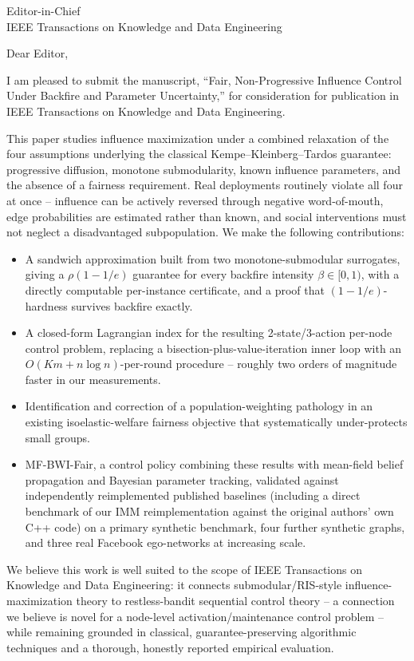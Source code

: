 \documentclass[11pt]{letter}
\begin{document}
\begin{letter}{Editor-in-Chief\\IEEE Transactions on Knowledge and Data Engineering}

\opening{Dear Editor,}

I am pleased to submit the manuscript, ``Fair, Non-Progressive Influence
Control Under Backfire and Parameter Uncertainty,'' for consideration for
publication in IEEE Transactions on Knowledge and Data Engineering.

This paper studies influence maximization under a combined relaxation of
the four assumptions underlying the classical Kempe--Kleinberg--Tardos
guarantee: progressive diffusion, monotone submodularity, known influence
parameters, and the absence of a fairness requirement. Real deployments
routinely violate all four at once -- influence can be actively reversed
through negative word-of-mouth, edge probabilities are estimated rather
than known, and social interventions must not neglect a disadvantaged
subpopulation. We make the following contributions:

\begin{itemize}
\item A sandwich approximation built from two monotone-submodular
  surrogates, giving a $\rho(1-1/e)$ guarantee for every backfire
  intensity $\beta \in [0,1)$, with a directly computable per-instance
  certificate, and a proof that $(1-1/e)$-hardness survives backfire
  exactly.
\item A closed-form Lagrangian index for the resulting 2-state/3-action
  per-node control problem, replacing a bisection-plus-value-iteration
  inner loop with an $O(Km + n\log n)$-per-round procedure -- roughly
  two orders of magnitude faster in our measurements.
\item Identification and correction of a population-weighting pathology
  in an existing isoelastic-welfare fairness objective that
  systematically under-protects small groups.
\item MF-BWI-Fair, a control policy combining these results with
  mean-field belief propagation and Bayesian parameter tracking,
  validated against independently reimplemented published baselines
  (including a direct benchmark of our IMM reimplementation against the
  original authors' own C++ code) on a primary synthetic benchmark, four
  further synthetic graphs, and three real Facebook ego-networks at
  increasing scale.
\end{itemize}

We believe this work is well suited to the scope of IEEE Transactions on
Knowledge and Data Engineering: it connects submodular/RIS-style
influence-maximization theory to restless-bandit sequential control
theory -- a connection we believe is novel for a node-level
activation/maintenance control problem -- while remaining grounded in
classical, guarantee-preserving algorithmic techniques and a thorough,
honestly reported empirical evaluation.


\end{letter}
\end{document}
